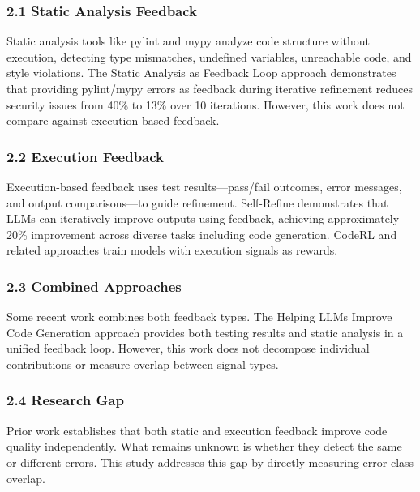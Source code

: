 
\subsubsection{2.1 Static Analysis Feedback}

Static analysis tools like pylint and mypy analyze code structure without execution, detecting type mismatches, undefined variables, unreachable code, and style violations. The Static Analysis as Feedback Loop approach demonstrates that providing pylint/mypy errors as feedback during iterative refinement reduces security issues from 40\% to 13\% over 10 iterations. However, this work does not compare against execution-based feedback.

\subsubsection{2.2 Execution Feedback}

Execution-based feedback uses test results---pass/fail outcomes, error messages, and output comparisons---to guide refinement. Self-Refine demonstrates that LLMs can iteratively improve outputs using feedback, achieving approximately 20\% improvement across diverse tasks including code generation. CodeRL and related approaches train models with execution signals as rewards.

\subsubsection{2.3 Combined Approaches}

Some recent work combines both feedback types. The Helping LLMs Improve Code Generation approach provides both testing results and static analysis in a unified feedback loop. However, this work does not decompose individual contributions or measure overlap between signal types.

\subsubsection{2.4 Research Gap}

Prior work establishes that both static and execution feedback improve code quality independently. What remains unknown is whether they detect the same or different errors. This study addresses this gap by directly measuring error class overlap.

